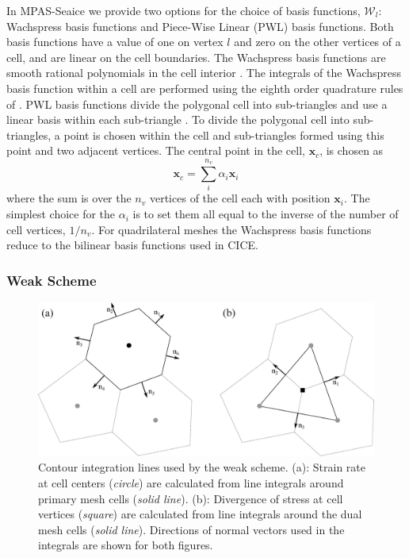 In MPAS-Seaice we provide two options for the choice of basis functions, $\mathcal{W}_l$: Wachspress basis functions and Piece-Wise Linear (PWL) basis functions. Both basis functions have a value of one on vertex $l$ and zero on the other vertices of a cell, and are linear on the cell boundaries. The Wachspress basis functions are smooth rational polynomials in the cell interior \citep{Dasgupta03}. The integrals of the Wachspress basis function within a cell are performed using the eighth order quadrature rules of \citet{Dunavant85}. PWL basis functions divide the polygonal cell into sub-triangles and use a linear basis within each sub-triangle \citep{Bailey08}. To divide the polygonal cell into sub-triangles, a point is chosen within the cell and sub-triangles formed using this point and two adjacent vertices. The central point in the cell, $\mathbf{x}_c$,  is chosen as
\begin{equation}
\mathbf{x}_c = \sum_i^{n_v} \alpha_i \mathbf{x}_i
\end{equation}
where the sum is over the $n_v$ vertices of the cell each with position $\mathbf{x}_i$. The simplest choice for the $\alpha_i$ is to set them all equal to the inverse of the number of cell vertices, $1/n_v$. For quadrilateral meshes the Wachspress basis functions reduce to the bilinear basis functions used in CICE.

\subsubsection{Weak Scheme}

\begin{figure}[]
\centering
\includegraphics[width=\linewidth]{seaice/mesh_weak.eps}
\caption{Contour integration lines used by the weak scheme. (a): Strain rate at cell centers (\emph{circle}) are calculated from line integrals around primary mesh cells (\emph{solid line}). (b): Divergence of stress at cell vertices (\emph{square}) are calculated from line integrals around the dual mesh cells (\emph{solid line}). Directions of normal vectors used in the integrals are shown for both figures.}
\label{fig:mesh_weak}
\end{figure}


